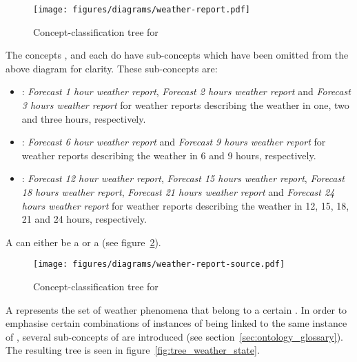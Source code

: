\begin{figure}
  \centering
  \texttt{[image: figures/diagrams/weather-report.pdf]}
  \caption{Concept-classification tree for }
  \label{fig:tree_weather_report}
\end{figure}

The concepts ,  and  each do have sub-concepts which have been omitted from the above diagram for clarity. These sub-concepts are:
\begin{itemize}
  \item {}: \emph{Forecast 1 hour weather report}, \emph{Forecast 2 hours weather report} and \emph{Forecast 3 hours weather report} for weather reports describing the weather in one, two and three hours, respectively.
  \item {}: \emph{Forecast 6 hour weather report} and \emph{Forecast 9 hours weather report} for weather reports describing the weather in 6 and 9 hours, respectively.
  \item {}: \emph{Forecast 12 hour weather report}, \emph{Forecast 15 hours weather report}, \emph{Forecast 18 hours weather report}, \emph{Forecast 21 hours weather report} and \emph{Forecast 24 hours weather report} for weather reports describing the weather in 12, 15, 18, 21 and 24 hours, respectively.
\end{itemize}

A  can either be a  or a  (see figure~\ref{fig:tree_weather_source}).

\begin{figure}
  \centering
  \texttt{[image: figures/diagrams/weather-report-source.pdf]}
  \caption{Concept-classification tree for }
  \label{fig:tree_weather_source}
\end{figure}

A  represents the set of weather phenomena that belong to a certain . In order to emphasise certain combinations of instances of  being linked to the same instance of , several sub-concepts of  are introduced (see section~\ref{sec:ontology_glossary}). The resulting tree is seen in figure~\ref{fig:tree_weather_state}.

